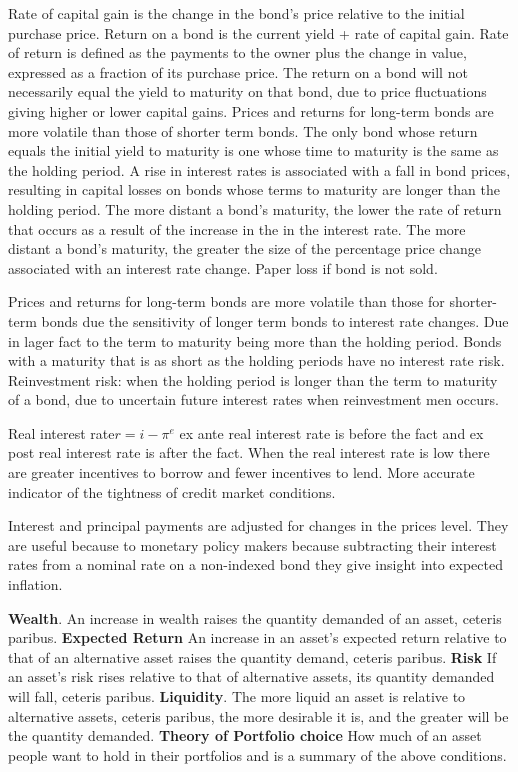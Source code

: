 \documentclass[12pt]{examnotes}
\begin{document}
\ra Rate of capital gain is the change in the bond's price relative to the initial purchase price.
\ra Return on a bond is the current yield + rate of capital gain.
\ra Rate of return is defined as the payments to the owner plus the change in value, expressed as a fraction of its purchase price.
\ra The return on a bond will not necessarily equal the yield to maturity on that bond, due to price fluctuations giving higher or lower capital gains. 
\ra Prices and returns for long-term bonds are more volatile than those of shorter term bonds. 
\ra The only bond whose return equals the initial yield to maturity is one whose time to maturity is the same as the holding period.
\ra A rise in interest rates is associated with a fall in bond prices, resulting in capital losses on bonds whose terms to maturity are longer than the holding period.
\ra The more distant a bond's maturity, the lower the rate of return that occurs as a result of the increase in the in the interest rate. 
\ra The more distant a bond's maturity, the greater the size of the percentage price change associated with an interest rate change.
\ra Paper loss if bond is not sold.

\ra Prices and returns for long-term bonds are more volatile than those for shorter-term bonds due the sensitivity of longer term bonds to interest rate changes. 
\ra Due in lager fact to the term to maturity being more than the holding period.
\ra Bonds with a maturity that is as short as the holding periods have no interest rate risk.
\ra Reinvestment risk: when the holding period is longer than the term  to maturity of a bond, due to uncertain future interest rates when reinvestment men occurs.

\ra Real interest rate$r=i-\pi^e$ 
\ra ex ante real interest rate is before the fact and ex post real interest rate is after the fact.
\ra When the real interest rate is low there are greater incentives to borrow and fewer incentives to lend. 
\ra More accurate indicator of the tightness of credit market conditions. 

\ra Interest and principal payments are adjusted for changes in the prices level. 
\ra They are useful because to monetary policy makers because subtracting their interest rates from a nominal rate on a non-indexed bond they give insight into expected inflation.

\textbf{Wealth}. An increase in wealth raises the quantity demanded of an asset, ceteris paribus. 
\textbf{Expected Return} An increase in an asset's expected return relative to that of an alternative asset raises the quantity demand, ceteris paribus. 
\textbf{Risk} If an asset's risk rises relative to that of alternative assets, its quantity demanded will fall, ceteris paribus. 
\textbf{Liquidity}. The more liquid an asset is relative to alternative assets, ceteris paribus, the more desirable it is, and the greater will be the quantity demanded. 
\textbf{Theory of Portfolio choice} How much of an asset people want to hold in their portfolios and is a summary of the above conditions. 
\end{document}

